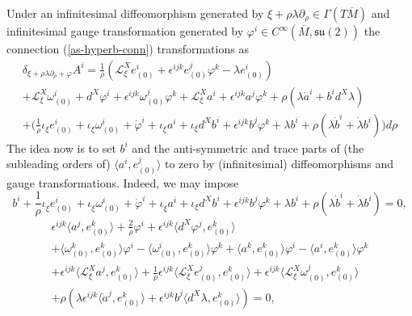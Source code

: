 \documentclass[a4paper,12pt]{article}
\newcommand{\cL}{{\mathcal L}}
\newcommand{\su}{\mathfrak {su}}
\begin{document}
Under an infinitesimal diffeomorphism generated by $\xi+\rho\lambda\partial_\rho\in\Gamma(T\overline{M})$ and infinitesimal gauge transformation generated by $\varphi^i\in C^\infty(\overline{M},\su(2))$ the connection (\ref{as-hyperb-conn}) transformations as
\begin{multline*}
\delta_{\xi+\rho\lambda\partial_\rho+\varphi}A^i%
=\frac{1}{\rho}(\cL^X_\xi e^i_{(0)}+\epsilon^{ijk}e^j_{(0)}\varphi^k-\lambda e^i_{(0)})
\\
+\cL^X_\xi \omega^i_{(0)}+d^X\varphi^i+\epsilon^{ijk}\omega_{(0)}^j\varphi^k+\cL^X_\xi a^i+\epsilon^{ijk}a^j\varphi^k+\rho(\lambda \dot a^i+b^id^X\lambda)
\\
+\Big(\frac{1}{\rho}\iota_{\dot \xi}e^i_{(0)}+\iota_{\dot \xi}\omega^i_{(0)}+\dot \varphi^i+\iota_{\dot \xi}a^i+\iota_\xi d^X b^i+\epsilon^{ijk} b^j\varphi^k+\lambda b^i+\rho(\lambda\dot b^i+\dot \lambda b^i)\Big)d\rho
\end{multline*}
The idea now is to set $b^i$ and the anti-symmetric and trace parts of (the subleading orders of) $\langle a^i,e^j_{(0)}\rangle$ to zero by (infinitesimal) diffeomorphisms and gauge transformations. Indeed, we may impose
$$b^i+\frac{1}{\rho}\iota_{\dot \xi}e^i_{(0)}+\iota_{\dot \xi}\omega^i_{(0)}+\dot \varphi^i+\iota_{\dot \xi}a^i+\iota_\xi d^X b^i+\epsilon^{ijk} b^j\varphi^k+\lambda b^i+\rho(\lambda\dot b^i+\dot \lambda b^i)=0,$$
\begin{multline*}
\epsilon^{ijk}\langle a^j,e^k_{(0)}\rangle+\frac{2}{\rho}\varphi^i+\epsilon^{ijk}\langle d^X\varphi^j,e^k_{(0)}\rangle
\\
+\langle \omega^k_{(0)},e^k_{(0)}\rangle \varphi^i-\langle \omega^i_{(0)},e^k_{(0)}\rangle \varphi^k+\langle a^k,e^k_{(0)}\rangle\varphi^i-\langle a^i,e^k_{(0)}\rangle\varphi^k
\\
+\epsilon^{ijk}\langle \cL_\xi^Xa^j,e^k_{(0)}\rangle+\frac{1}{\rho}\epsilon^{ijk}\langle \cL^X_{\xi}e^j_{(0)},e^k_{(0)}\rangle
+\epsilon^{ijk}\langle \cL^X_{\xi}\omega_{(0)}^j,e^k_{(0)}\rangle
\\
+\rho(\lambda\epsilon^{ijk}\langle \dot a^j,e^k_{(0)}\rangle+\epsilon^{ijk}b^j\langle d^X\lambda,e^k_{(0)}\rangle)=0,
\end{multline*}
\end{document}
